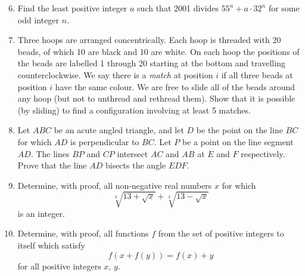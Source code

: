 \documentclass[12pt]{article}
\begin{document}
\begin{enumerate}
\setcounter{enumi}{5}
\item Find the least positive integer $a$ such that 2001 divides $55^n + a \cdot 32^n$ for some odd integer $n$.

\item Three hoops are arranged concentrically. Each hoop is threaded with 20 beads, of which 10 are black and 10 are white. On each hoop the positions of the beads are labelled 1 through 20 starting at the bottom and travelling counterclockwise.
We say there is a \textit{match} at position $i$ if all three beads at position $i$ have the same colour. We are free to slide all of the beads around any hoop (but not to unthread and rethread them).
Show that it is possible (by sliding) to find a configuration involving at least 5 matches.

\item Let $ABC$ be an acute angled triangle, and let $D$ be the point on the line $BC$ for which $AD$ is perpendicular to $BC$. Let $P$ be a point on the line segment $AD$. The lines $BP$ and $CP$ intersect $AC$ and $AB$ at $E$ and $F$ respectively. Prove that the line $AD$ bisects the angle $EDF$.

\item Determine, with proof, all non-negative real numbers $x$ for which
\[
\sqrt[3]{13 + \sqrt{x}} + \sqrt[3]{13 - \sqrt{x}}
\]
is an integer.

\item Determine, with proof, all functions $f$ from the set of positive integers to itself which satisfy
\[
f(x + f(y)) = f(x) + y
\]
for all positive integers $x$, $y$.

\end{enumerate}
\end{document}
